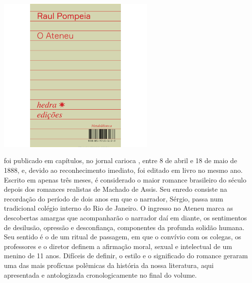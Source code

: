 \pagebreak %

\begin{center}
\hspace*{.5cm}\includegraphics[width=78mm]{./grid/ateneu.jpg}
\end{center}

\hspace*{-7cm}\hrulefill\hspace*{-7cm}

\medskip

 foi publicado em capítulos,
no jornal carioca {}, entre 8 de abril e 18 de maio de 1888, e,
devido ao reconhecimento imediato, foi editado em livro no mesmo ano.
Escrito em apenas três meses, é considerado o maior romance brasileiro do
século  depois dos romances realistas de Machado de Assis. Seu
enredo consiste na recordação do período de dois anos em que o narrador,
Sérgio, passa num tradicional colégio interno do Rio de Janeiro. O
ingresso no Ateneu marca as descobertas amargas que acompanharão o
narrador daí em diante, os sentimentos de desilusão, opressão e
desconfiança, componentes da profunda solidão humana. Seu sentido é o
de um ritual de passagem, em que o convívio com os colegas, os
professores e o diretor definem a afirmação moral, sexual e intelectual
de um menino de 11 anos. Difíceis de definir, o estilo e o
significado do romance geraram uma das mais profícuas polêmicas da
história da nossa literatura, aqui apresentada e antologizada
cronologicamente no final do volume.


\vfill

\hspace*{-.4cm}\begin{minipage}[c]{.5\linewidth}
\small{
{}}
\end{minipage}

